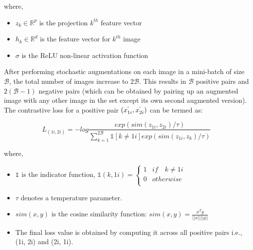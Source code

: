 where,
\begin{itemize}[label={}]
  \setlength\itemsep{0em}
  \item $z_k \in \mathbb{R}^{p}$ is the projection $k^{th}$ feature vector
  \item $h_k \in \mathbb{R}^{d}$ is the feature vector for $k^{th}$ image
  \item $\sigma$ is the ReLU \cite{nwankpa2018} non-linear activation function
\end{itemize}
After performing stochastic augmentations on each image in a mini-batch of size $\mathcal{B}$, the total number of images increase to $2\mathcal{B}$. This results in $\mathcal{B}$ positive pairs and $2(\mathcal{B}-1)$ negative pairs (which can be obtained by pairing up an augmented image with any other image in the set except its own second augmented version). The contrastive loss for a positive pair $(x_{1i}^{`}, x_{2i}^{`})$ can be termed as:

\begin{equation}
    \label{equation:simclr_contrastive_loss}
    L_{(1i, 2i)} = -log \frac{exp(sim(z_{1i}, z_{2i}) / \tau)}{\sum_{k=1}^{2\mathcal{B}} \mathbb{1}[k\neq 1i] exp(sim(z_{1i}, z_{k}) / \tau)}
\end{equation}

where,
\begin{itemize}[label={}]
  \setlength\itemsep{0em}
  \item $\mathbb{1}$ is the indicator function, $\mathbb{1}(k, 1i) = \begin{cases} 
      1 & if \quad k \neq 1i \\
      0 & otherwise \\
   \end{cases}$ 
   \item $\tau$ denotes a temperature parameter. 
   \item $sim(x, y)$ is the cosine similarity function: $sim(x, y) = \frac{x^{T}y}{||x||||y||}$
   \item The final loss value is obtained by computing it across all positive pairs i.e., (1i, 2i) and (2i, 1i).
\end{itemize}

